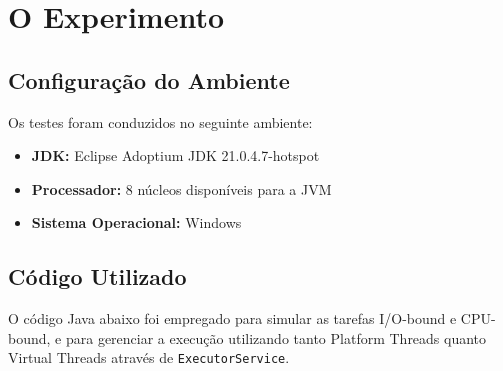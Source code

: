 \documentclass[12pt,a4paper]{article}
\begin{document}
\section{O Experimento}

\subsection{Configuração do Ambiente}
Os testes foram conduzidos no seguinte ambiente:
\begin{itemize}
    \item \textbf{JDK:} Eclipse Adoptium JDK 21.0.4.7-hotspot
    \item \textbf{Processador:} 8 núcleos disponíveis para a JVM
    \item \textbf{Sistema Operacional:} Windows
\end{itemize}

\subsection{Código Utilizado}
O código Java abaixo foi empregado para simular as tarefas I/O-bound e CPU-bound, e para gerenciar a execução utilizando tanto Platform Threads quanto Virtual Threads através de \texttt{ExecutorService}.
\end{document}
